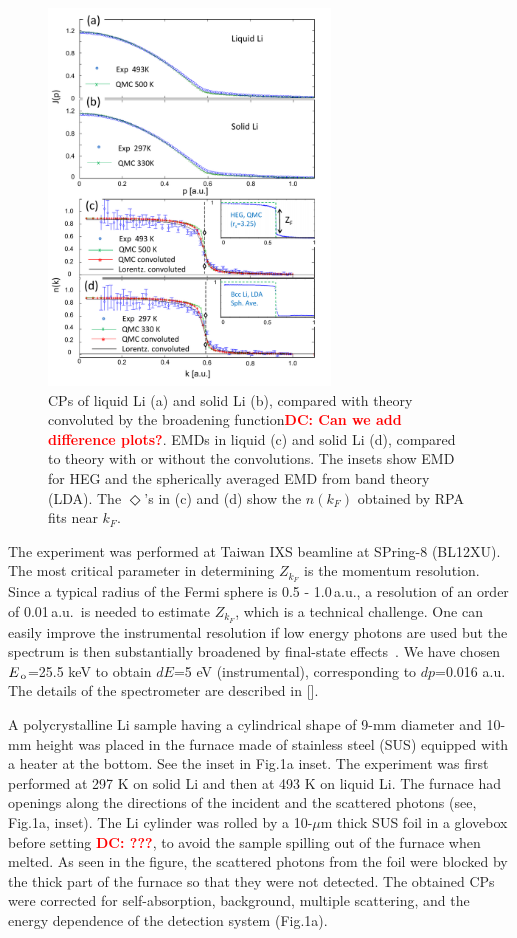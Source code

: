 \documentclass[twocolumn,showpacs,showkeys,fleqn,prl,superscriptaddress]{revtex4}%
\newcommand{\nn}[1]{\textnormal{ #1}}
\newcommand{\dc}[1]{\textcolor{red}{\textbf{DC: #1}}}
\begin{document}
\begin{figure}
\includegraphics[bb= 50 10 500 720, width=7.5cm]{fig2.pdf}
\caption{CPs of liquid Li (a) and solid Li (b), compared with theory convoluted by the broadening function\dc{Can we add difference plots?}.  EMDs in liquid (c) and solid Li (d), compared to theory with or without the convolutions. The insets show EMD for HEG and the spherically averaged EMD from band theory (LDA). The $\Diamond$'s in (c) and (d)  show the $n(k_F)$ obtained by RPA fits near $k_F$.}
\label{Fig.2}
\end{figure}

The experiment was performed at Taiwan IXS beamline at SPring-8 (BL12XU).
The most critical parameter in determining $Z_{k_F}$ is the momentum resolution.
Since a typical radius of the Fermi sphere is 0.5 - 1.0\,a.u., a resolution of an order of 0.01\,a.u.\, is needed to estimate $Z_{k_F}$, which is a technical challenge.
One can easily improve the instrumental resolution if low energy photons are used but the spectrum is then substantially broadened by final-state effects~\cite{stern00,soi01}.
We have chosen $E_{\nn{\!o}}$=25.5 keV to obtain $dE$=5 eV (instrumental), corresponding to $dp$=0.016 a.u.
The details of the spectrometer are described in [].

A polycrystalline Li sample having a cylindrical shape of 9-mm diameter and 10-mm height was placed in the furnace made of stainless steel (SUS) equipped with a heater at the bottom. See the inset in Fig.1a inset.
The experiment was first performed at 297 K on solid Li and then at 493 K on liquid Li.
The furnace had openings along the directions of the incident and the scattered photons (see, Fig.1a, inset).
The Li cylinder was rolled by a 10-$\mu$m thick SUS foil in a glovebox before setting \dc{???}, to avoid the sample spilling out of the furnace when melted.
As seen in the figure, the scattered photons from the foil were blocked by the thick part of the furnace so that they were not detected.
The obtained CPs were corrected for self-absorption, background, multiple scattering, and the energy dependence of the detection system (Fig.1a).
\end{document}
